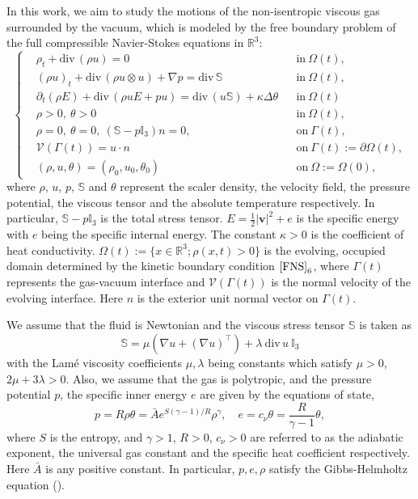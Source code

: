 \documentclass[12pt,a4paper]{amsart}
\numberwithin{equation}{section}
\theoremstyle{plain}
\theoremstyle{definition}
\newcommand{\dv}{\mathrm{div}}
\newcommand{\vv}{\mathbf{v}}
\begin{document}
In this work, we aim to study the motions of the non-isentropic viscous gas surrounded by the vacuum,
which is modeled by the free boundary problem of the full compressible Navier-Stokes equations in $\mathbb{R}^3$:
\begin{equation}\label{FNS}
\left\{
\begin{aligned}
& \rho_t+\dv\, (\rho u)=0 && \text{in}\ \Omega(t), \\
& (\rho u)_t +\dv \, (\rho u \otimes u)+\nabla p= \dv \, \mathbb{S} && \text{in}\ \Omega(t),\\
&\partial_t (\rho E)+\dv\, (\rho u E+p u )=\dv\, (u \mathbb{S})+\kappa\Delta\theta && \text{in}\ \Omega(t)\\
&\rho>0,~\theta>0&& \text{in}\ \Omega(t),\\
& \rho=0,\ \theta=0,\ (\mathbb{S}-p\mathbb{I}_3) n=0,  && \text{on} \ \Gamma(t),\\
& \mathcal{V}(\Gamma (t))=u\cdot n && \text{on} \ \Gamma(t):=\partial \Omega(t),\\
&(\rho,u,\theta)=(\rho_0,u_0,\theta_0) && \text{on} \ \Omega:=\Omega(0),
\end{aligned}
\right.
\end{equation}
where $\rho$, $u$, $p$, $\mathbb{S}$  and $\theta$ represent the scaler density, the velocity field, the pressure potential, the viscous tensor and the absolute temperature respectively. In particular, $ \mathbb S - p\mathbb I_3 $ is the total stress tensor. 
$E=\frac{1}{2}|\vv|^2+e$ is the specific energy with $e $ being the specific internal energy.
The constant $\kappa>0$ is the coefficient of heat conductivity.
$\Omega(t) := \lbrace x\in\mathbb{R}^3; \rho(x,t) > 0 \rbrace $ is the evolving, occupied domain determined by the kinetic boundary condition $ \eqref{FNS}_{6} $, where $\Gamma(t)$ represents the gas-vacuum interface  and $\mathcal{V}(\Gamma(t))$ is the normal velocity of the evolving interface. 
Here $n$ is the exterior unit normal vector on $ \Gamma(t) $.


We assume that the fluid is Newtonian and the viscous stress tensor $\mathbb{S}$ is taken as 
$$
\mathbb{S}=\mu (\nabla u+(\nabla u)^\intercal)+\lambda \ \dv \, u \ \mathbb{I}_3 
$$
with the Lam\'{e} viscosity coefficients $\mu, \lambda$ being constants  which satisfy $\mu>0 $, $ 2\mu+3\lambda > 0 $. 
Also, we assume that the gas is polytropic, and the pressure potential $p$, the specific inner energy $ e $ are given by the equations of state,
\begin{equation}
\label{state1}
p=R\rho\theta = \bar{A}e^{S(\gamma-1)/R}\rho^{\gamma}, \quad e=c_\nu \theta = \dfrac{R}{\gamma-1}\theta,
\end{equation}
where $S$ is the entropy, and $\gamma>1$, $R>0$, $ c_{\nu}>0$ are referred to as the adiabatic exponent, the universal gas constant and the specific heat coefficient respectively. 
Here $ \bar A $ is any positive constant. 
In particular, $ p, e, \rho $ satisfy the Gibbs-Helmholtz equation (\cite{Feireisl2009}).
\end{document}
